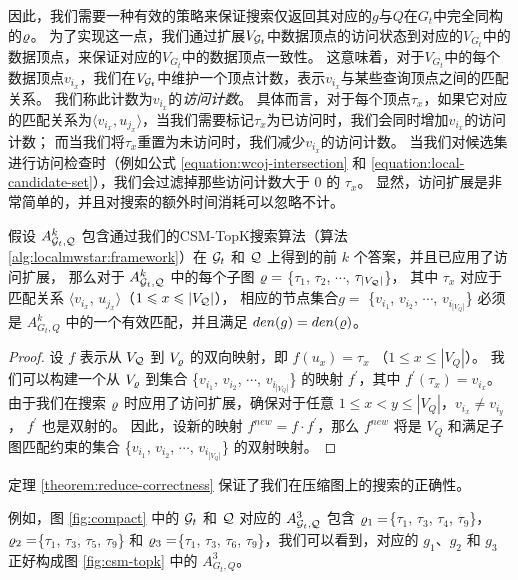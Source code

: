 因此，我们需要一种有效的策略来保证搜索仅返回其对应的$g$与$Q$在$G_t$中完全同构的$\varrho$。
为了实现这一点，我们通过扩展$V_{\mathcal{G}_t}$中数据顶点的访问状态到对应的$V_{G_t}$中的数据顶点，来保证对应的$V_{G_t}$中的数据顶点一致性。
这意味着，对于$V_{G_t}$中的每个数据顶点$v_{i_x}$，我们在$V_{\mathcal{G}_t}$中维护一个顶点计数，表示$v_{i_x}$与某些查询顶点之间的匹配关系。
我们称此计数为$v_{i_x}$的\emph{访问计数}。
具体而言，对于每个顶点$\tau_x$，如果它对应的匹配关系为$\langle v_{i_x}, u_{j_x} \rangle$，当我们需要标记$\tau_x$为已访问时，我们会同时增加$v_{i_x}$的访问计数；
而当我们将$\tau_x$重置为未访问时，我们减少$v_{i_x}$的访问计数。
当我们对候选集进行访问检查时（例如公式 \ref{equation:wcoj-intersection} 和 \ref{equation:local-candidate-set}），我们会过滤掉那些访问计数大于 0 的 $\tau_x$。
显然，访问扩展是非常简单的，并且对搜索的额外时间消耗可以忽略不计。
\begin{theorem} \label{theorem:reduce-correctness}
假设 $A_{\mathcal{G}_t, \mathcal{Q}}^k$ 包含通过我们的CSM-TopK搜索算法（算法 \ref{alg:localmwstar:framework}）在 $\mathcal{G}_t$ 和 $\mathcal{Q}$ 上得到的前 $k$ 个答案，并且已应用了访问扩展，
那么对于 $A_{\mathcal{G}_t, \mathcal{Q}}^k$ 中的每个子图 $\varrho=$ \{$\tau_1$, $\tau_2$, $\cdots$, $\tau_{|V_{\mathcal{Q}}|}$\}，
其中 $\tau_{x}$ 对应于匹配关系 $\langle v_{i_x}$, $u_{j_x}\rangle$（$1\leqslant x\leqslant |V_{\mathcal{Q}}|$），
相应的节点集合$g=$ \{$v_{i_1}$, $v_{i_2}$, $\cdots$, $v_{i_{|V_Q|}}$\} 必须是 $A_{G_t, Q}^k$ 中的一个有效匹配，并且满足 $den(g) = den(\varrho)$。
\end{theorem}
\begin{proof}
设 $f$ 表示从 $V_{\mathcal{Q}}$ 到 $V_{\varrho}$ 的双向映射，即 $f(u_x) = \tau_x$ （$1\leq x\leq |V_Q|$）。
我们可以构建一个从 $V_{\varrho}$ 到集合 \{$v_{i_1}$, $v_{i_2}$, $\cdots$, $v_{i_{|V_Q|}}$\} 的映射 $f^{\prime}$，其中 $f^{\prime}(\tau_x) = v_{i_x}$。
由于我们在搜索 $\varrho$ 时应用了访问扩展，确保对于任意 $1\leq x<y\leq |V_Q|$，$v_{i_x} \neq v_{i_y}$， $f^{\prime}$ 也是双射的。
因此，设新的映射 $f^{new} = f \cdot f^\prime$，那么 $f^{new}$ 将是 $V_Q$ 和满足子图匹配约束的集合 \{$v_{i_1}$, $v_{i_2}$, $\cdots$, $v_{i_{|V_Q|}}$\} 的双射映射。
\end{proof}
定理 \ref{theorem:reduce-correctness} 保证了我们在压缩图上的搜索的正确性。

例如，图 \ref{fig:compact} 中的 $\mathcal{G}_t$ 和 $\mathcal{Q}$ 对应的 $A_{\mathcal{G}_t, \mathcal{Q}}^3$ 包含 $\varrho_1=$\{$\tau_1$, $\tau_3$, $\tau_4$, $\tau_9$\}，$\varrho_2=$\{$\tau_1$, $\tau_3$, $\tau_5$, $\tau_9$\} 和 $\varrho_3=$\{$\tau_1$, $\tau_3$, $\tau_6$, $\tau_9$\}，我们可以看到，对应的 $g_1$、$g_2$ 和 $g_3$ 正好构成图 \ref{fig:csm-topk} 中的 $A_{G_t, Q}^3$。

